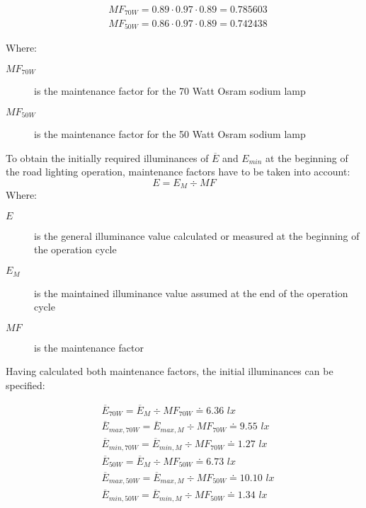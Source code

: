 \begin{align}
&MF_{70W} = 0.89 \cdot 0.97 \cdot 0.89 = 0.785603\\
&MF_{50W} = 0.86 \cdot 0.97 \cdot 0.89 = 0.742438
\end{align}

Where:
\begin{description}
	\item[$MF_{70W}$] is the maintenance factor for the 70 Watt Osram sodium lamp
	\item[$MF_{50W}$] is the maintenance factor for the 50 Watt Osram sodium lamp
\end{description}

To obtain the initially required illuminances of $\overline{E}$ and $E_{min}$ at the beginning of the road lighting operation, maintenance factors have to be taken into account:
\begin{equation}
E = E_{M} \div MF
\end{equation}
Where:
\begin{description}
	\item[$E$] is the general illuminance value calculated or measured at the beginning of the operation cycle
	\item[$E_{M}$] is the maintained illuminance value assumed at the end of the operation cycle
	\item[$MF$] is the maintenance factor
\end{description}

Having calculated both maintenance factors, the initial illuminances can be specified:

\begin{align}
&\overline{E}_{70W} = \overline{E}_{M} \div MF_{70W} \doteq 6.36 \textit{ lx}\\
&\overline{E}_{max,70W} = \overline{E}_{max,M} \div MF_{70W} \doteq 9.55 \textit{ lx}\\
&\overline{E}_{min,70W} = \overline{E}_{min,M} \div MF_{70W} \doteq 1.27 \textit{ lx}\\
&\overline{E}_{50W} = \overline{E}_{M} \div MF_{50W} \doteq 6.73 \textit{ lx}\\
&\overline{E}_{max,50W} = \overline{E}_{max,M} \div MF_{50W} \doteq 10.10 \textit{ lx}\\
&\overline{E}_{min,50W} = \overline{E}_{min,M} \div MF_{50W} \doteq 1.34 \textit{ lx}
\end{align}
